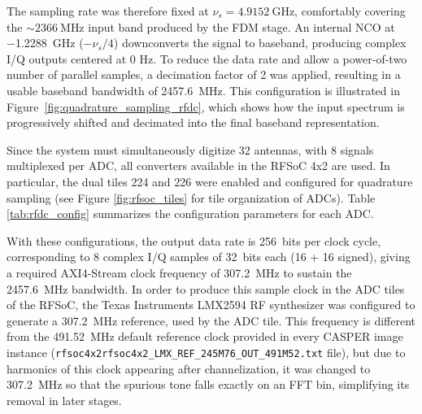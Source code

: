 The sampling rate was therefore fixed at $\nu_s=\SI{4.9152}{\giga\hertz}$, comfortably covering the $\sim\SI{2366}{\mega\hertz}$ input band produced by the FDM stage. An internal NCO at \SI{-1.2288}{\giga\hertz} ($-\nu_s/4$) downconverts the signal to baseband, producing complex I/Q outputs centered at 0 Hz. To reduce the data rate and allow a power-of-two number of parallel samples, a decimation factor of 2 was applied, resulting in a usable baseband bandwidth of \SI{2457.6}{\mega\hertz}. This configuration is illustrated in Figure~\ref{fig:quadrature_sampling_rfdc}, which shows how the input spectrum is progressively shifted and decimated into the final baseband representation.

Since the system must simultaneously digitize 32 antennas, with 8 signals multiplexed per ADC, all converters available in the RFSoC 4x2 are used. In particular, the dual tiles 224 and 226 were enabled and configured for quadrature sampling (see Figure \ref{fig:rfsoc_tiles} for tile organization of ADCs). Table \ref{tab:rfdc_config} summarizes the configuration parameters for each ADC.

With these configurations, the output data rate is \SI{256}{bits} per clock cycle, corresponding to 8 complex I/Q samples of \SI{32}{bits} each (16 + 16 signed), giving a required AXI4-Stream clock frequency of \SI{307.2}{\mega\hertz} to sustain the \SI{2457.6}{\mega\hertz} bandwidth. In order to produce this sample clock in the ADC tiles of the RFSoC, the Texas Instruments LMX2594 RF synthesizer \citep{LMX2594} was configured to generate a \SI{307.2}{\mega\hertz} reference, used by the ADC tile. This frequency is different from the \SI{491.52}{\mega\hertz} default reference clock provided in every CASPER image instance (\texttt{rfsoc4x2rfsoc4x2\_LMX\_REF\_245M76\_OUT\_491M52.txt} file), but due to harmonics of this clock appearing after channelization, it was changed to \SI{307.2}{\mega\hertz} so that the spurious tone falls exactly on an FFT bin, simplifying its removal in later stages.

